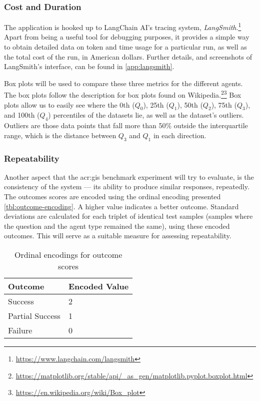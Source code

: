 \subsubsection{Cost and Duration}
\label{subsubsec:cost-and-duration}

The application is hooked up to LangChain AI's tracing system, \textit{LangSmith}.\footnote{\url{https://www.langchain.com/langsmith}} Apart from being a useful tool for debugging purposes, it provides a simple way to obtain detailed data on token and time usage for a particular run, as well as the total cost of the run, in American dollars. Further details, and screenshots of LangSmith's interface, can be found in \autoref{app:langsmith}.

Box plots will be used to compare these three metrics for the different agents. The box plots follow the description for box plots found on Wikipedia.\footnote{\url{https://matplotlib.org/stable/api/_as_gen/matplotlib.pyplot.boxplot.html}}\footnote{\url{https://en.wikipedia.org/wiki/Box_plot}} Box plots allow us to easily see where the 0th ($Q_0$), 25th ($Q_1$), 50th ($Q_2$), 75th ($Q_3$), and 100th ($Q_4$) percentiles of the datasets lie, as well as the dataset's outliers. Outliers are those data points that fall more than 50\% outside the interquartile range, which is the distance between $Q_3$ and $Q_1$ in each direction.

\subsubsection{Repeatability}
\label{subsubsec:repeatability}

Another aspect that the \acrshort{acr:gis} benchmark experiment will try to evaluate, is the consistency of the system --- its ability to produce similar responses, repeatedly. The outcomes scores are encoded using the ordinal encoding presented \autoref{tbl:outcome-encoding}. A higher value indicates a better outcome. Standard deviations are calculated for each triplet of identical test samples (samples where the question and the agent type remained the same), using these encoded outcomes. This will serve as a suitable measure for assessing repeatability.

\begin{table}[htbp]
    \centering
    \caption{Ordinal encodings for outcome scores}
    \label{tbl:outcome-encoding}
    \begin{tabularx}{0.5\textwidth}{XX}
        \toprule
        \textbf{Outcome} & \textbf{Encoded Value} \\
        \midrule
        Success          & 2                      \\
        Partial Success  & 1                      \\
        Failure          & 0                      \\
        \bottomrule
    \end{tabularx}
\end{table}


